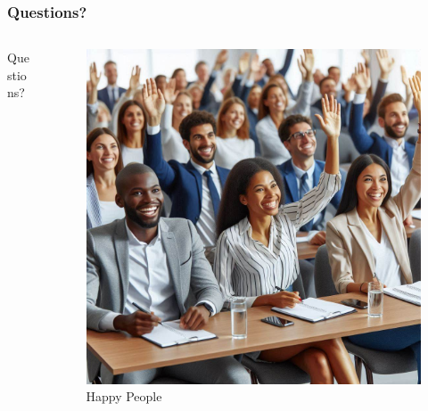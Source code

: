 \documentclass{beamer}
\begin{document}
\begin{frame}
  \frametitle{Questions?}
  \begin{columns}
    \begin{column}{0.5\textwidth}
      Questions?
    \end{column}
    \begin{column}{0.5\textwidth}
      \begin{figure}
        \caption{Happy People\footnotemark[1]}
        \includegraphics[width=.8\textwidth]{images/questions.jpeg}\footnotemark[1]
      \end{figure}
    \end{column}
  \end{columns}
\end{frame}
\end{document}
